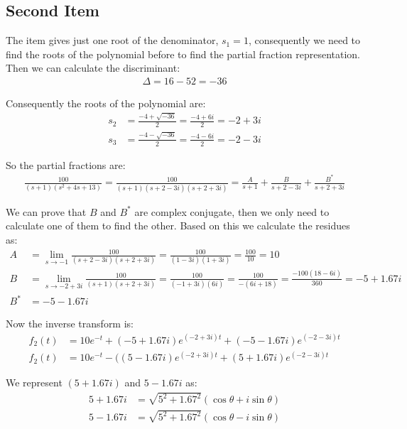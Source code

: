 \documentclass[a4paper,11pt]{article}
\begin{document}
\subsection*{Second Item}
\par The item gives just one root of the denominator, $s_1=1$, consequently we need to find the roots of the polynomial before to find the partial fraction representation. Then we can calculate the discriminant:
\begin{align}
\Delta = 16-52=-36
\end{align}
\par Consequently the roots of the polynomial are:
\begin{align*}
s_2 &=\frac{-4+\sqrt{-36}}{2} = \frac{-4 + 6i}{2}=-2 +3i\\
s_3 &=\frac{-4-\sqrt{-36}}{2} =\frac{-4-6i}{2}= -2-3i
\end{align*}
\par So the partial fractions are:
\begin{align*}
\frac{100}{(s+1)(s^2+4s+13)}=\frac{100}{(s+1)(s+2-3i)(s+2+3i)}=\frac{A}{s+1}+\frac{B}{s+2-3i}+\frac{B^*}{s+2+3i}
\end{align*}
\vspace{1mm}
\par We can prove that $B$ and $B^*$ are complex conjugate, then we only need to calculate one of them to find the other. Based on this we calculate the residues as: 
\begin{align*}
A  &= \lim_{s \rightarrow -1} \frac{100}{(s+2-3i)(s+2+3i)}=\frac{100}{(1-3i)(1+3i)}=\frac{100}{10}=10\\
B  &= \lim_{s \rightarrow -2+3i} \frac{100}{(s+1)(s+2+3i)} = \frac{100}{(-1+3i)(6i)}=\frac{100}{-(6i+18)}=\frac{-100(18-6i)}{360}=-5+1.67i\\
B^*&= -5 -1.67i
\end{align*}
\par Now the inverse transform is:
\begin{align*}
f_2(t)&=10e^{-t}+(-5+1.67i)e^{(-2+3i)t}+(-5-1.67i)e^{(-2-3i)t}\\
f_2(t)&=10e^{-t}-((5-1.67i)e^{(-2+3i)t}+(5+1.67i)e^{(-2-3i)t} 
\end{align*}
\par We represent $(5+1.67i)$ and $5-1.67i$ as:
\begin{align*}
5+1.67i &= \sqrt{5^2+1.67^2}(\cos\theta + i \sin\theta)\\
5-1.67i &= \sqrt{5^2+1.67^2}(\cos\theta-i\sin\theta)
\end{align*}
\end{document}
